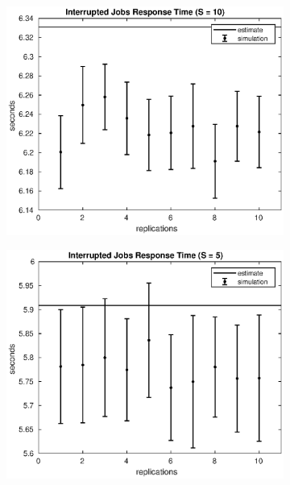 \begin{frame}
\begin{figure}[!h]
\begin{subfigure}[t]{0.49\textwidth}
\label{15_sintr}
\end{subfigure}
%
\begin{subfigure}[t]{0.49\textwidth}
\includegraphics[width=\textwidth]{../figures/simul/10_500K_sintr}
\label{10_sintr}
\end{subfigure}
%
\begin{subfigure}[t]{0.49\textwidth}
\includegraphics[width=\textwidth]{../figures/simul/5_500K_sintr}
\label{5_sintr}
\end{subfigure}
%
\label{plot:sintr}
\end{figure}
\end{frame}
